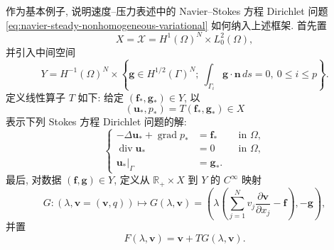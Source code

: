 作为基本例子, 说明速度--压力表述中的 Navier--Stokes 方程 Dirichlet 问题
\eqref{eq:navier-steady-nonhomogeneous-variational} 如何纳入上述框架. 首先置
\begin{equation}\label{eq:navier-branch-ns-spaces}
X=\mathscr X=H^1(\Omega)^N\times L_0^2(\Omega),
\end{equation}
并引入中间空间
\begin{equation}\label{eq:navier-branch-ns-data-space}
Y=H^{-1}(\Omega)^N\times
\left\{\mathbf g\in H^{1/2}(\Gamma)^N;
\ \int_{\Gamma_i}\mathbf g\cdot\mathbf n\,ds=0,
\ 0\leq i\leq p\right\}.
\end{equation}
定义线性算子 $T$ 如下: 给定 $(\mathbf f_*,\mathbf g_*)\in Y$, 以
\[
(\mathbf u_*,p_*)=T(\mathbf f_*,\mathbf g_*)\in X
\]
表示下列 Stokes 方程 Dirichlet 问题的解:
\begin{equation}\label{eq:navier-branch-stokes-solution-operator}
\left\{
\begin{aligned}
-\Delta\mathbf u_*+\operatorname{grad}p_*&=\mathbf f_*&&\text{in }\Omega,\\
\operatorname{div}\mathbf u_*&=0&&\text{in }\Omega,\\
\mathbf u_*|_\Gamma&=\mathbf g_*.
\end{aligned}
\right.
\end{equation}
最后, 对数据 $(\mathbf f,\mathbf g)\in Y$, 定义从
$\mathbb R_+\times X$ 到 $Y$ 的 $C^\infty$ 映射
\begin{equation}\label{eq:navier-branch-ns-nonlinear-map}
G:(\lambda,\mathbf v=(\mathbf v,q))
\longmapsto
G(\lambda,\mathbf v)
=\left(
\lambda\left(\sum_{j=1}^{N}v_j
\frac{\partial\mathbf v}{\partial x_j}-\mathbf f\right),
-\mathbf g
\right),
\end{equation}
并置
\begin{equation}\label{eq:navier-branch-ns-compound-map}
F(\lambda,\mathbf v)=\mathbf v+TG(\lambda,\mathbf v).
\end{equation}


